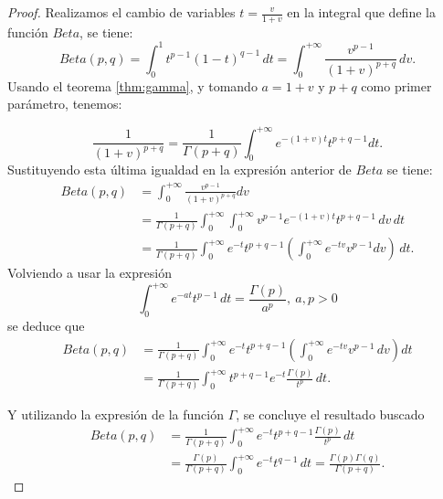 \begin{proof}
    Realizamos el cambio de variables $t = \frac{v}{1+v}$ en la integral
    que define la función $Beta$, se tiene:
    \[
        Beta(p,q)=\int_{0}^{1}t^{p-1}(1-t)^{q-1}\,dt=
        \int_{0}^{+\infty}\frac{v^{p-1}}{(1+v)^{p+q}}\,dv.
    \]
    Usando el teorema \ref{thm:gamma}, y tomando $a = 1 + v$ y 
    $p + q$ como primer parámetro, tenemos:

    \[
        \frac{1}{(1+v)^{p+q}}=\frac{1}{\Gamma(p+q)} \int_0^{+\infty} e^{-(1+v) t} t^{p+q-1} d t .
    \]
    Sustituyendo esta última igualdad en la expresión anterior
    de $Beta$ se tiene:
    \begin{align*}
        Beta(p, q) &=\int_0^{+\infty} \frac{v^{p-1}}{(1+v)^{p+q}}
        dv\\
        &=\frac{1}{\Gamma(p+q)} \int_0^{+\infty} \int_0^{+\infty}
        v^{p-1} e^{-(1+v) t} t^{p+q-1} \,dv\,dt\\
        & =\frac{1}{\Gamma(p+q)} \int_0^{+\infty} e^{-t} t^{p+q-1}
        \left(\int_0^{+\infty} e^{-t v} v^{p-1} dv\right)\,dt.
    \end{align*}
    Volviendo a usar la expresión
    \[
        \int_0^{+\infty} e^{-a t} t^{p-1} \,dt=
        \frac{\Gamma(p)}{a^p},\ a, p>0
    \]
    se deduce que
    \begin{align*}
        Beta(p, q)&=\frac{1}{\Gamma(p+q)} \int_0^{+\infty}
        e^{-t} t^{p+q-1} \left(\int_0^{+\infty} e^{-t v} v^{p-1}
        \,dv\right) d t\\
        &=\frac{1}{\Gamma(p+q)}\int_0^{+\infty} t^{p+q-1}
        e^{-t} \frac{\Gamma(p)}{t^p}\,dt.
    \end{align*}
        
    Y utilizando la expresión de la función $\Gamma$, se concluye
    el resultado buscado
    \begin{align*}
        Beta(p, q)&=\frac{1}{\Gamma(p+q)} \int_0^{+\infty} e^{-t}
        t^{p+q-1} \frac{\Gamma(p)}{t^p}\,dt\\
        &=\frac{\Gamma(p)}{\Gamma(p+q)} \int_0^{+\infty} e^{-t}
        t^{q-1} \,dt=\frac{\Gamma(p) \Gamma(q)} {\Gamma(p+q)}.
    \end{align*}
    
\end{proof}
